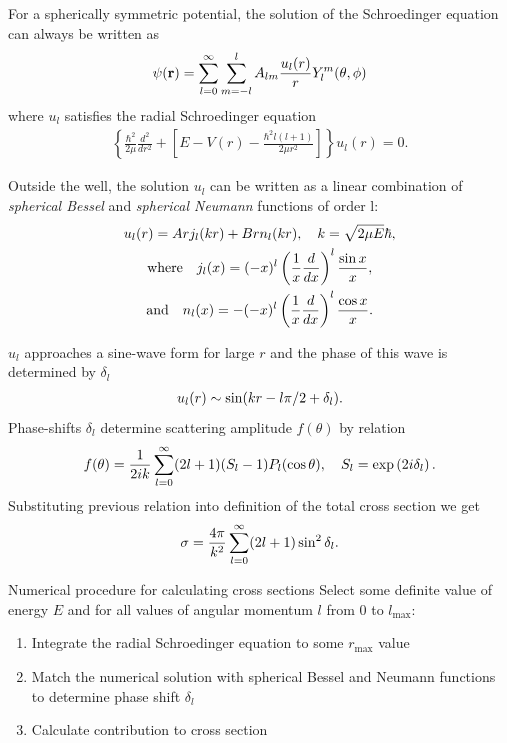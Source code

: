 \documentclass[10pt,pdf,hyperref={unicode}]{beamer}
\newcommand{\lb}{\left(}
\newcommand{\rb}{\right)}
\begin{document}
\begin{frame}
	For a spherically symmetric potential, the solution of the Schroedinger equation can always be written as 
	\begin{gather}
		\psi(\mathbf{r}) = \sum_{l = 0}^\infty \sum_{m = -l}^l A_{lm} \frac{u_l(r)}{r} Y_l^m(\theta, \phi) \notag
	\end{gather}
	where $u_l$ satisfies the radial Schroedinger equation
	\begin{gather}
		\left\{ \frac{\hbar^2}{2\mu} \frac{d^2}{dr^2} + \left[ E - V(r) - \frac{\hbar^2 l(l+1)}{2 \mu r^2} \right] \right\} u_l(r) = 0.
	\end{gather}

	Outside the well, the solution $u_l$ can be written as a linear combination of \textit{spherical Bessel} and \textit{spherical Neumann} functions of order l:
	\begin{gather}
			u_l(r) = A r j_l(k r) + B r n_l(k r), \quad k = \sqrt{2 \mu E}{\hbar}, \notag \\
		\text{where} \quad j_l(x) = (-x)^l \lb \frac{1}{x} \frac{d}{dx} \rb^l \frac{\sin x}{x}, \notag \\
		\text{and} \quad n_l(x) = - (-x)^l \lb \frac{1}{x} \frac{d}{dx} \rb^l \frac{\cos x}{x}. \notag 
	\end{gather}
\end{frame}

\begin{frame}
		$u_l$ approaches a sine-wave form for large $r$ and the phase of this wave is determined by $\delta_l$ 
	\begin{gather}
		u_l(r) \sim \sin (kr - l \pi / 2 + \delta_l). \notag
	\end{gather}
	Phase-shifts $\delta_l$ determine scattering amplitude $f(\theta)$ by relation 
	\begin{gather}
		f(\theta) = \frac{1}{2 ik} \sum_{l = 0}^\infty (2l + 1)(S_l - 1) P_l(\cos \theta), \quad S_l = \exp \lb 2 i \delta_l \rb. \notag
	\end{gather}
	Substituting previous relation into definition of the total cross section we get
	\begin{gather}
		\sigma = \frac{4 \pi}{k^2} \sum_{l = 0}^\infty (2l + 1) \sin^2 \delta_l . \notag
	\end{gather}
\end{frame}

\begin{frame}{Numerical procedure for calculating cross sections }
		Select some definite value of energy $E$ and for all values of angular momentum $l$ from $0$ to $l_\text{max}$:
\begin{enumerate}
	\item Integrate the radial Schroedinger equation to some $r_\text{max}$ value
	\item Match the numerical solution with spherical Bessel and Neumann functions to determine phase shift $\delta_l$
	\item Calculate contribution to cross section 
\end{enumerate}
\end{frame}
\end{document}
